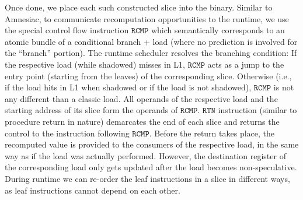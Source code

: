 Once done, we place 
each such constructed slice into the binary. 
Similar to Amnesiac, to communicate recomputation opportunities to the runtime, we use 
the special control
flow instruction $\texttt{RCMP}$ which semantically corresponds to an atomic bundle of a conditional branch + load (where no prediction is involved for the ``branch'' portion).
The runtime scheduler resolves the branching condition: If the respective load (while shadowed) misses in L1, $\texttt{RCMP}$ acts as a jump to the entry point (starting from the
leaves) of the corresponding slice. Otherwise (i.e., if the load hits in L1 when shadowed or if the load is not shadowed), $\texttt{RCMP}$ is not any different than a classic load.
All operands of
the respective load and the starting address of its slice form the operands of $\texttt{RCMP}$. 
$\texttt{RTN}$ instruction (similar to procedure return in nature) demarcates the end of each slice and returns the control to the instruction following $\texttt{RCMP}$. Before the return takes place, the recomputed value is provided to the consumers of the respective load, in the same way as if the load was actually performed. However, the destination register of the corresponding load only gets updated after the load becomes non-speculative.
During runtime we can re-order the leaf instructions in a slice in different ways, as leaf instructions cannot
depend on each other. 


